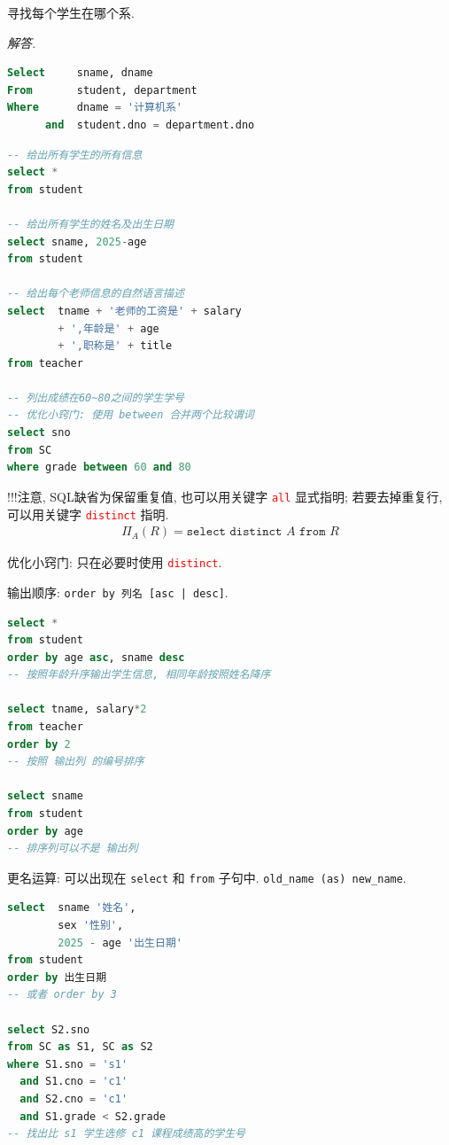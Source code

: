 \begin{example}
  寻找每个学生在哪个系.
\end{example}

\textit{ 解答. }
\begin{lstlisting}[language=SQL]
Select     sname, dname
From       student, department
Where      dname = '计算机系'
      and  student.dno = department.dno
\end{lstlisting}

\begin{lstlisting}[language=SQL]
-- 给出所有学生的所有信息
select *
from student

-- 给出所有学生的姓名及出生日期
select sname, 2025-age
from student

-- 给出每个老师信息的自然语言描述
select  tname + '老师的工资是' + salary
        + ',年龄是' + age
        + ',职称是' + title
from teacher

-- 列出成绩在60~80之间的学生学号
-- 优化小窍门: 使用 between 合并两个比较谓词
select sno
from SC
where grade between 60 and 80
\end{lstlisting}

!!!注意, SQL缺省为保留重复值, 也可以用关键字 \textcolor{red}{\texttt{all}} 显式指明; 若要去掉重复行, 可以用关键字 \textcolor{red}{\texttt{distinct}} 指明.
\begin{align*}
    \Pi_A(R) = \texttt{select distinct }A\texttt{ from }R
\end{align*}

优化小窍门: 只在必要时使用 \textcolor{red}{\texttt{distinct}}.

输出顺序: \texttt{order by 列名 [asc | desc]}.
\begin{lstlisting}[language=SQL]
select *
from student
order by age asc, sname desc
-- 按照年龄升序输出学生信息, 相同年龄按照姓名降序

select tname, salary*2
from teacher
order by 2
-- 按照 输出列 的编号排序

select sname
from student
order by age
-- 排序列可以不是 输出列
\end{lstlisting}

更名运算: 可以出现在 \verb|select| 和 \verb|from| 子句中. \verb|old_name (as) new_name|.

\begin{lstlisting}[language=SQL]
select  sname '姓名',
        sex '性别',
        2025 - age '出生日期'
from student
order by 出生日期
-- 或者 order by 3

select S2.sno
from SC as S1, SC as S2
where S1.sno = 's1'
  and S1.cno = 'c1'
  and S2.cno = 'c1'
  and S1.grade < S2.grade
-- 找出比 s1 学生选修 c1 课程成绩高的学生号
\end{lstlisting}

